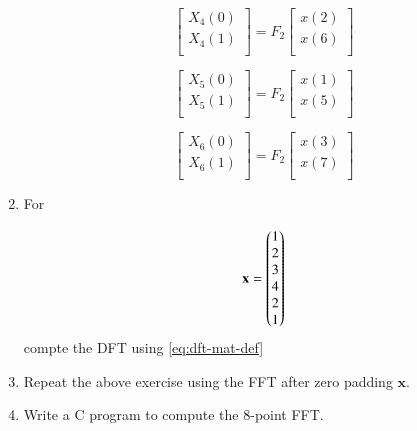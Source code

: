 \documentclass[journal,12pt,twocolumn]{IEEEtran}
\let\vec\mathbf
\renewcommand\thesection{\arabic{section}}
\begin{document}
\begin{enumerate}[label=\arabic*.,ref=\thesection.\theenumi]
\begin{equation}
\begin{bmatrix}
X_{4}(0) \\ 
X_{4}(1)\\ 
\end{bmatrix}
= F_{2}
\begin{bmatrix}
x(2) \\ 
x(6) \\ 
\end{bmatrix}
\end{equation}

\begin{equation}
\begin{bmatrix}
X_{5}(0) \\ 
X_{5}(1)\\ 
\end{bmatrix}
= F_{2}
\begin{bmatrix}
x(1) \\ 
x(5) \\ 
\end{bmatrix}
\end{equation}

\begin{equation}
\begin{bmatrix}
X_{6}(0) \\ 
X_{6}(1)\\ 
\end{bmatrix}
= F_{2}
\begin{bmatrix}
x(3) \\ 
x(7) \\ 
\end{bmatrix}
\end{equation}

\item For 

    \begin{align}
	    \vec{x} = \myvec{1\\2\\3\\4\\2\\1}
        \label{eq:equation1}
    \end{align}
    compte the DFT  
		using 
	    \eqref{eq:dft-mat-def}
    \item Repeat the above exercise using the FFT
	    after zero padding $\vec{x}$.
\item Write a C program to compute the 8-point FFT. 
 \end{enumerate}
\end{document}
